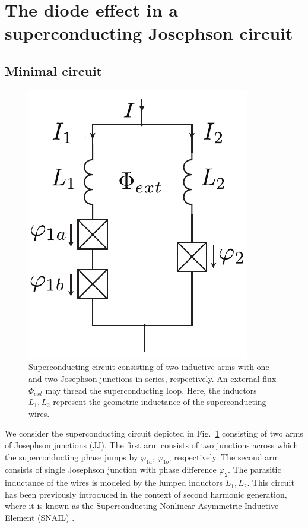 \documentclass[aps,rsi,reprint,amsmath,amssymb,floatfix,longbibliography,superscriptaddress]{revtex4-1}
\begin{document}
\section{The diode effect in a superconducting Josephson circuit}
\label{sec:main}
\subsection{Minimal circuit}
\label{sec:twojunctions}

\begin{figure}[ht]
	\centering
	\includegraphics[width=0.6\columnwidth]{circuit-snail-inductive.pdf}
	\caption{Superconducting circuit consisting of two inductive arms with
	one and two Josephson junctions in series, respectively. An external flux
$\Phi_{ext}$ may thread the superconducting loop. Here, the inductors $L_1,L_2$ represent the geometric inductance of the superconducting wires.}
	\label{fig:circuit1}
\end{figure}



We consider the superconducting circuit depicted in Fig.~\ref{fig:circuit1}
consisting of two arms of Josephson junctions (JJ). The first arm consists of two
junctions across which the superconducting phase jumps by $\varphi_{1a}$,
$\varphi_{1b}$, respectively. The second arm consists of
single Josephson junction with phase difference $\varphi_{2}$. The parasitic inductance of the wires is modeled by the lumped inductors $L_1, L_2$.
This circuit 
has been previously introduced in the context of 
second harmonic
generation, where it is known as the Superconducting Nonlinear Asymmetric Inductive Element
(SNAIL) \cite{Frattini2017}.
\end{document}
